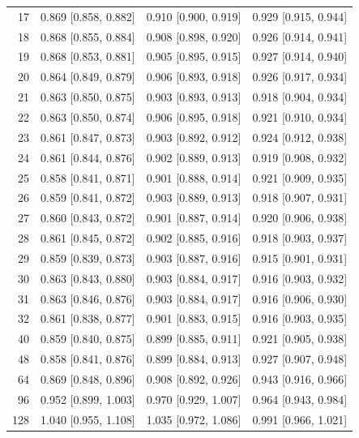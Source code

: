 \begin{longtable}{rccc}
17 & 0.869 [0.858, 0.882] & 0.910 [0.900, 0.919] & 0.929 [0.915, 0.944] \\
18 & 0.868 [0.855, 0.884] & 0.908 [0.898, 0.920] & 0.926 [0.914, 0.941] \\
19 & 0.868 [0.853, 0.881] & 0.905 [0.895, 0.915] & 0.927 [0.914, 0.940] \\
20 & 0.864 [0.849, 0.879] & 0.906 [0.893, 0.918] & 0.926 [0.917, 0.934] \\
21 & 0.863 [0.850, 0.875] & 0.903 [0.893, 0.913] & 0.918 [0.904, 0.934] \\
22 & 0.863 [0.850, 0.874] & 0.906 [0.895, 0.918] & 0.921 [0.910, 0.934] \\
23 & 0.861 [0.847, 0.873] & 0.903 [0.892, 0.912] & 0.924 [0.912, 0.938] \\
24 & 0.861 [0.844, 0.876] & 0.902 [0.889, 0.913] & 0.919 [0.908, 0.932] \\
25 & 0.858 [0.841, 0.871] & 0.901 [0.888, 0.914] & 0.921 [0.909, 0.935] \\
26 & 0.859 [0.841, 0.872] & 0.903 [0.889, 0.913] & 0.918 [0.907, 0.931] \\
27 & 0.860 [0.843, 0.872] & 0.901 [0.887, 0.914] & 0.920 [0.906, 0.938] \\
28 & 0.861 [0.845, 0.872] & 0.902 [0.885, 0.916] & 0.918 [0.903, 0.937] \\
29 & 0.859 [0.839, 0.873] & 0.903 [0.887, 0.916] & 0.915 [0.901, 0.931] \\
30 & 0.863 [0.843, 0.880] & 0.903 [0.884, 0.917] & 0.916 [0.903, 0.932] \\
31 & 0.863 [0.846, 0.876] & 0.903 [0.884, 0.917] & 0.916 [0.906, 0.930] \\
32 & 0.861 [0.838, 0.877] & 0.901 [0.883, 0.915] & 0.916 [0.903, 0.935] \\
40 & 0.859 [0.840, 0.875] & 0.899 [0.885, 0.911] & 0.921 [0.905, 0.938] \\
48 & 0.858 [0.841, 0.876] & 0.899 [0.884, 0.913] & 0.927 [0.907, 0.948] \\
64 & 0.869 [0.848, 0.896] & 0.908 [0.892, 0.926] & 0.943 [0.916, 0.966] \\
96 & 0.952 [0.899, 1.003] & 0.970 [0.929, 1.007] & 0.964 [0.943, 0.984] \\
128 & 1.040 [0.955, 1.108] & 1.035 [0.972, 1.086] & 0.991 [0.966, 1.021] \\
\end{longtable}

